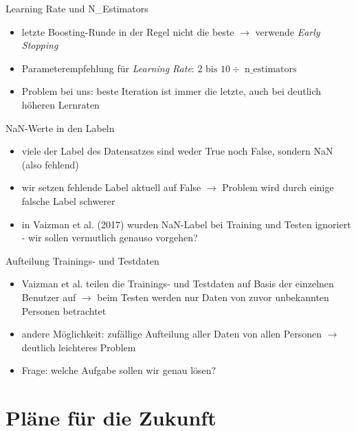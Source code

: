 \documentclass[10pt,%
	wide,%
	xcolor={x11names},%
	hyperref={colorlinks},%
	pantone312,%
	handout,%
	]{beamer}
\begin{document}
\begin{frame}[t]{Learning Rate und N\_Estimators}
	\begin{itemize}
		\item letzte Boosting-Runde in der Regel nicht die beste $\rightarrow$ verwende \emph{Early Stopping}
		\item Parameterempfehlung für \emph{Learning Rate}: $2 \text{ bis } 10 \div \operatorname{n\_estimators}$
		\item Problem bei uns: beste Iteration ist immer die letzte, auch bei deutlich höheren Lernraten
	\end{itemize}
\end{frame}

\begin{frame}[t]{NaN-Werte in den Labeln}
	\begin{itemize}
		\item viele der Label des Datensatzes sind weder True noch False, sondern NaN (also fehlend)
		\item wir setzen fehlende Label aktuell auf False $\rightarrow$ Problem wird durch einige falsche Label schwerer
		\item in Vaizman et al. (2017) wurden NaN-Label bei Training und Testen ignoriert - wir sollen vermutlich genauso vorgehen?
	\end{itemize}
\end{frame}

\begin{frame}[t]{Aufteilung Trainings- und Testdaten}
	\begin{itemize}
		\item Vaizman et al. teilen die Trainings- und Testdaten auf Basis der einzelnen Benutzer auf $\rightarrow$ beim Testen werden nur Daten von zuvor unbekannten Personen betrachtet
		\item andere Möglichkeit: zufällige Aufteilung aller Daten von allen Personen $\rightarrow$ deutlich leichteres Problem
		\item Frage: welche Aufgabe sollen wir genau lösen?
	\end{itemize}
\end{frame}

\section{Pläne für die Zukunft}
\end{document}

